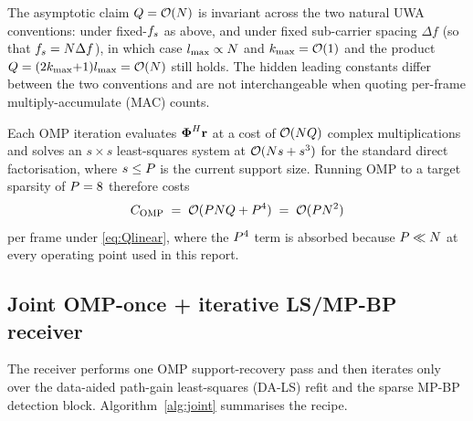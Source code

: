 The asymptotic claim $Q = \mathcal{O}(N)$ is invariant across the two natural UWA conventions: under fixed-$f_s$ as above, and under fixed sub-carrier spacing $\Delta f$ (so that $f_s = N \Delta f$), in which case $l_{\max} \propto N$ and $k_{\max} = \mathcal{O}(1)$ and the product $Q = (2k_{\max}{+}1)l_{\max} = \mathcal{O}(N)$ still holds. The hidden leading constants differ between the two conventions and are not interchangeable when quoting per-frame multiply-accumulate (MAC) counts.

Each OMP iteration evaluates $\boldsymbol{\Phi}^H \mathbf{r}$ at a cost of $\mathcal{O}(N Q)$ complex multiplications and solves an $s\times s$ least-squares system at $\mathcal{O}(N s + s^3)$ for the standard direct factorisation, where $s \leq P$ is the current support size. Running OMP to a target sparsity of $P = 8$ therefore costs
\begin{equation}
C_{\text{OMP}} \;=\; \mathcal{O}(P N Q + P^4) \;=\; \mathcal{O}(P N^2) \label{eq:omp_cost}
\end{equation}
per frame under \eqref{eq:Qlinear}, where the $P^4$ term is absorbed because $P \ll N$ at every operating point used in this report.

\subsection{Joint OMP-once + iterative LS/MP-BP receiver}
\label{ssec:joint}

The receiver performs one OMP support-recovery pass and then iterates only over the data-aided path-gain least-squares (DA-LS) refit and the sparse MP-BP detection block. Algorithm~\ref{alg:joint} summarises the recipe.

